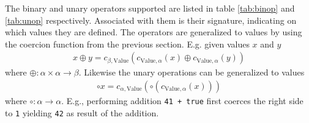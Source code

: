 The binary and unary operators supported are listed in table \ref{tab:binop} and \ref{tab:unop} respectively. Associated with them is their signature, indicating on which values they are defined. The operators are generalized to values by using the coercion function from the previous section. E.g. given values $x$ and $y$
\begin{align*}
    x \oplus y =  c_{\beta, \text{Value}}(c_{\text{Value}, \alpha}(x) \oplus c_{\text{Value},\alpha}(y))
\end{align*}
where $\oplus : \alpha \times \alpha \rightarrow \beta$. Likewise the unary operations can be generalized to values 
\begin{align*}
    \circ x = c_{\alpha, \text{Value}}(\circ (c_{\text{Value}, \alpha}(x)))
\end{align*}
where $\circ : \alpha \rightarrow \alpha $. E.g., performing addition \texttt{41 + true} first coerces the right side to \texttt{1} yielding \texttt{42} as result of the addition. 

\begin{comment}
Notice how the signature of the decrement is different from increment. This follows from the \emph{feature} that decrementing a variable containing \texttt{null} is not coerced to 0 and then decremented, but instead leaves the variable unchanged. This leads to the abstract decrement operation $\texttt{- -}: \text{Value}\rightarrow\text{Value}$.
\begin{align*}
		\texttt{- -} (v_a, v_s, v_n, v_b, v_u) =
		& (\bot, \bot, \notag\\
		&\quad\texttt{- -}(\coerce{Array}{Number}(v_a)\notag\\
		&\quad\quad\sqcup\coerce{String}{Number}(v_s) \notag\\
		&\quad\quad\sqcup v_n \notag\\
		&\quad\quad\sqcup \coerce{Boolean}{Number}(v_b)), \bot, v_u)
\end{align*}
where $\texttt{- -} : \text{Number}\rightarrow\text{Number}$ is defined by table \ref{tab:abs_dec_inl}.

\begin{table}

\centering
\begin{tabular}{l|ccccc}
\texttt{- -} 	& $\bot$ 	& $n$ 	& uInt		& notUInt	&$\top$ \\\hline
			 	& $\bot$ 	& $n-1$	& $\top$	& notUInt	&$\top$	
\end{tabular}
\caption{Abstract pre- and post-decrement\label{tab:abs_dec_inl}}

\end{table}
\end{comment}

